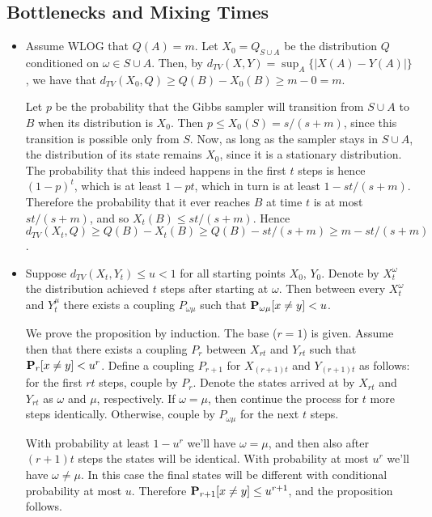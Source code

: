 \documentclass[11pt]{article} \usepackage{amssymb}
\begin{document}
\subsection{Bottlenecks and Mixing Times}
\begin{itemize}
\item 
  Assume WLOG that $Q(A)=m$. 
  Let $X_0=Q_{S\cup A}$ be the distribution $Q$ conditioned on $\omega\in S\cup A$. Then, by 
  $d_{TV}(X,Y)=\sup_A\{|X(A)-Y(A)|\}$, we have that 
  $d_{TV}(X_0,Q)\geq Q(B)-X_0(B)\geq m-0=m$. 
  
  Let $p$ be the probability that
  the Gibbs sampler will transition from $S\cup A$ to $B$ when its distribution
  is $X_0$. Then $p\leq X_0(S) = s/(s+m)$, since this transition is 
  possible only from $S$. Now, as long as the sampler stays in $S\cup A$,
  the distribution of its state remains $X_0$, since it is a stationary
  distribution. The probability that this indeed happens in the
  first $t$ steps is hence $(1-p)^t$, which is at least $1-pt$, which in turn
  is at least $1-st/(s+m)$.
  Therefore the probability that it ever reaches $B$ at time $t$ is at most
  $st/(s+m)$, and so $X_t(B)\leq st/(s+m)$. 
  Hence $d_{TV}(X_t,Q)\geq Q(B)-X_t(B)\geq Q(B)-st/(s+m) \geq m-st/(s+m)$.

\item

  Suppose $d_{TV}(X_t,Y_t)\leq u < 1$ for all starting points $X_0$, $Y_0$. Denote
  by $X_t^\omega$ the distribution achieved $t$ steps after starting at 
  $\omega$. Then between every $X_t^\omega$ and $Y_t^\mu$ there exists a coupling 
  $P_{\omega\mu}$ such that $\P_{\omega\mu}[x\neq y] < u$.

  We prove the proposition by induction. The base ($r=1$) is given. Assume then
  that there exists a coupling $P_r$ 
  between $X_{rt}$ and $Y_{rt}$ such that $\P_r[x\neq y] < u^r$.
  Define a coupling $P_{r+1}$ for  $X_{(r+1)t}$ and $Y_{(r+1)t}$ as follows: for the
  first $rt$ steps, couple by $P_r$. Denote the states arrived at by $X_{rt}$ and
  $Y_{rt}$ as $\omega$ and $\mu$, respectively. If $\omega=\mu$, then
  continue the process for $t$ more steps identically. Otherwise, 
  couple by $P_{\omega\mu}$ for the next $t$ steps.

  With probability at least $1-u^r$ we'll have $\omega=\mu$, and then also 
  after $(r+1)t$ steps the states will be identical.
  With probability at most $u^r$ we'll have $\omega\neq\mu$. In this case the final states
  will be different with conditional probability at most $u$. Therefore
  $\P_{r+1}[x\neq y]\leq u^{r+1}$, and the proposition follows.
\end{itemize}
\end{document}
